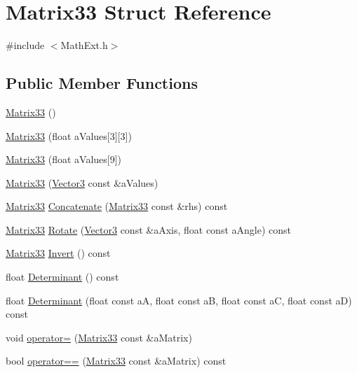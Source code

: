 \hypertarget{structMatrix33}{}\section{Matrix33 Struct Reference}
\label{structMatrix33}


{\ttfamily \#include $<$Math\+Ext.\+h$>$}

\subsection*{Public Member Functions}
\begin{DoxyCompactItemize}
\item 
\hyperlink{structMatrix33_a70acb6647b172d017cc4265a29a7d263}{Matrix33} ()
\item 
\hyperlink{structMatrix33_a925961737f602cf5c46a14b48f6c15af}{Matrix33} (float a\+Values\mbox{[}3\mbox{]}\mbox{[}3\mbox{]})
\item 
\hyperlink{structMatrix33_a3b036f1b40d42fbc1062a64ae257f51b}{Matrix33} (float a\+Values\mbox{[}9\mbox{]})
\item 
\hyperlink{structMatrix33_a81963918bedee0fc17a2f79dd323843e}{Matrix33} (\hyperlink{structVector3}{Vector3} const \&a\+Values)
\item 
\hyperlink{structMatrix33}{Matrix33} \hyperlink{structMatrix33_a2e55b6023d5164e1ac00c82f3fce11b0}{Concatenate} (\hyperlink{structMatrix33}{Matrix33} const \&rhs) const 
\item 
\hyperlink{structMatrix33}{Matrix33} \hyperlink{structMatrix33_aae5ec715f643ccf3144c50dc03d5eebe}{Rotate} (\hyperlink{structVector3}{Vector3} const \&a\+Axis, float const a\+Angle) const 
\item 
\hyperlink{structMatrix33}{Matrix33} \hyperlink{structMatrix33_a8684734a4e99ee09c164e27fa8ac3826}{Invert} () const 
\item 
float \hyperlink{structMatrix33_a8aa376f85ca88ab3ed2c63bf3d27507d}{Determinant} () const 
\item 
float \hyperlink{structMatrix33_a7b2da68ab75077b2a4b4be83edfeda77}{Determinant} (float const aA, float const aB, float const aC, float const aD) const 
\item 
void \hyperlink{structMatrix33_a1bafdfc46dbafa7615e28d99f1ebe08b}{operator=} (\hyperlink{structMatrix33}{Matrix33} const \&a\+Matrix)
\item 
bool \hyperlink{structMatrix33_a97612596778d55abfa22e9f07c59a1ed}{operator==} (\hyperlink{structMatrix33}{Matrix33} const \&a\+Matrix) const 

\end{DoxyCompactItemize}
